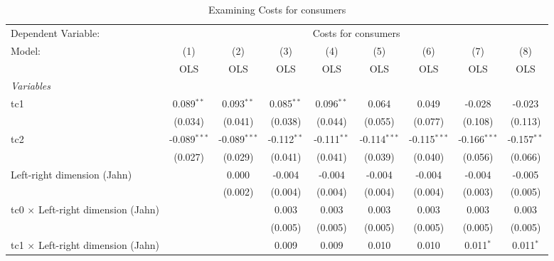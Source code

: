 
\begin{table}[htbp]
   \caption{Examining Costs for consumers}
   \centering
   \begin{tabular}{lcccccccc}
      \toprule
      Dependent Variable: & \multicolumn{8}{c}{Costs for consumers}\\
      Model:                                    & (1)            & (2)            & (3)           & (4)           & (5)            & (6)            & (7)            & (8)\\  
                                                &  OLS           & OLS            & OLS           & OLS           & OLS            & OLS            & OLS            & OLS\\  
      \midrule
      \emph{Variables}\\
      tc1                                       & 0.089$^{**}$   & 0.093$^{**}$   & 0.085$^{**}$  & 0.096$^{**}$  & 0.064          & 0.049          & -0.028         & -0.023\\   
                                                & (0.034)        & (0.041)        & (0.038)       & (0.044)       & (0.055)        & (0.077)        & (0.108)        & (0.113)\\   
      tc2                                       & -0.089$^{***}$ & -0.089$^{***}$ & -0.112$^{**}$ & -0.111$^{**}$ & -0.114$^{***}$ & -0.115$^{***}$ & -0.166$^{***}$ & -0.157$^{**}$\\   
                                                & (0.027)        & (0.029)        & (0.041)       & (0.041)       & (0.039)        & (0.040)        & (0.056)        & (0.066)\\   
      Left-right dimension (Jahn)               &                & 0.000          & -0.004        & -0.004        & -0.004         & -0.004         & -0.004         & -0.005\\   
                                                &                & (0.002)        & (0.004)       & (0.004)       & (0.004)        & (0.004)        & (0.003)        & (0.005)\\   
      tc0 $\times$ Left-right dimension (Jahn)  &                &                & 0.003         & 0.003         & 0.003          & 0.003          & 0.003          & 0.003\\   
                                                &                &                & (0.005)       & (0.005)       & (0.005)        & (0.005)        & (0.005)        & (0.005)\\   
      tc1 $\times$ Left-right dimension (Jahn)  &                &                & 0.009         & 0.009         & 0.010          & 0.010          & 0.011$^{*}$    & 0.011$^{*}$\\   

\end{tabular}
\end{table}
